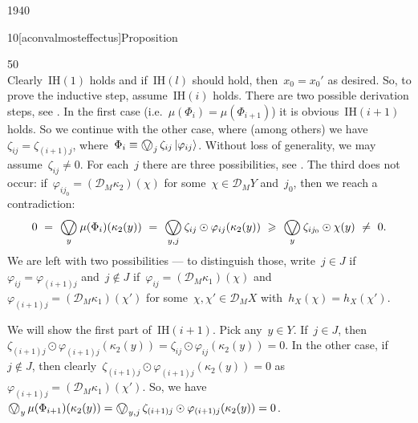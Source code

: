 \begin{parsec}{1940}
\begin{point}{10}[aconvalmosteffectus]{Proposition}
\begin{point}{50}
\begin{equation*}
\end{equation*}
Clearly~$\mathrm{IH}(1)$ holds
    and if~$\mathrm{IH}(l)$ should hold,
    then~$x_0 = x_0'$ as desired.
So, to prove the inductive step, assume~$\mathrm{IH}(i)$ holds.
There are two possible derivation steps, see .
In the first case (i.e.~$\mu(\Phi_i) = \mu(\Phi_{i+1})$)
    it is obvious~$\mathrm{IH}(i+1)$ holds.
So we continue with the other case,
where (among others) we have~$\zeta_{ij} = \zeta_{(i+1)j}$,
    where~$\Phi_i \equiv \bigovee_j \zeta_{ij} \ket{\varphi_{ij}}$.
Without loss of generality, we may assume~$\zeta_{ij} \neq 0$.
For each~$j$ there are three possibilities, see .
The third does not occur:
if~$\varphi_{ij_0} = (\mathcal{D}_M \kappa_2) (\chi)$
    for some~$\chi \in \mathcal{D}_M Y$ and~$j_0$,
    then we reach a contradiction:
\begin{equation*}
    0\ = \ 
    \bigovee_y \mu(\Phi_i)(\kappa_2(y))
    \ = \ \bigovee_{y,j} \zeta_{ij} \odot \varphi_{ij}(\kappa_2(y))
    \ \geq \ \bigovee_y \zeta_{ij_0} \odot \chi(y)\  \neq\  0.
\end{equation*}
We are left with two possibilities ---
    to distinguish those,
    write~$j \in J$ if~$\varphi_{ij} = \varphi_{(i+1)j}$
    and~$j \notin J$
    if~$\varphi_{ij} = (\mathcal{D}_M \kappa_1)(\chi)$
    and~$\varphi_{(i+1)j} = (\mathcal{D}_M \kappa_1)(\chi')$
    for some~$\chi,\chi' \in \mathcal{D}_M X$
    with~$h_X (\chi) = h_X(\chi')$.

    We will show the first part of~$\mathrm{IH}(i+1)$.
Pick any~$y \in Y$.
If~$j \in J$, then~$\zeta_{(i+1)j}\odot \varphi_{(i+1)j}(\kappa_2(y))
= \zeta_{ij} \odot \varphi_{ij}(\kappa_2(y)) = 0$.
In the other case, if~$j \notin J$,
then clearly~$\zeta_{(i+1)j}\odot \varphi_{(i+1)j}(\kappa_2(y)) = 0$
    as~$\varphi_{(i+1)j} = (\mathcal{D}_M \kappa_1)(\chi')$.
So, we have~$\bigovee_y \mu(\Phi_{i+1})(\kappa_2(y))
= \bigovee_{y,j} \zeta_{(i+1)j} \odot \varphi_{(i+1)j} (\kappa_2(y)) = 0 $.


\end{point}
\end{point}
\end{parsec}
